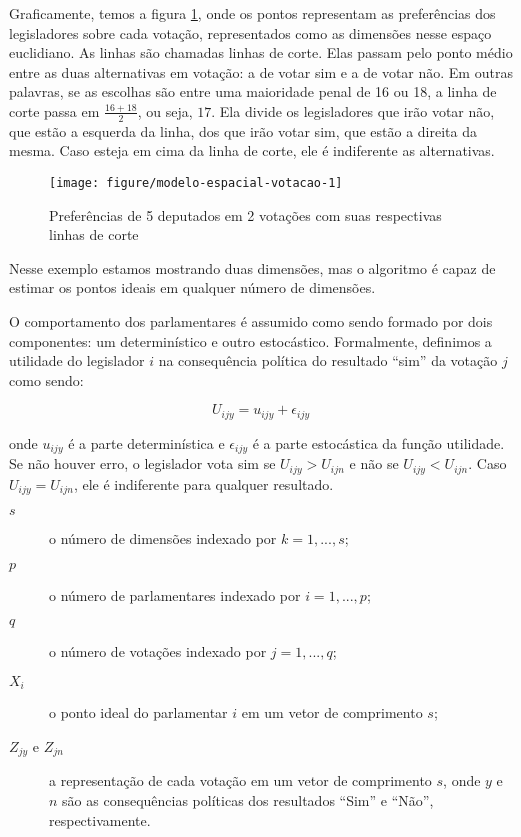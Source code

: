 \documentclass[a4paper,titlepage]{ppgi}\usepackage[]{graphicx}\usepackage[]{color}
\makeatletter
\def\maxwidth{ %
  \ifdim\Gin@nat@width>\linewidth
    \linewidth
  \else
    \Gin@nat@width
  \fi
}
\newenvironment{knitrout}{}{} %
\makeatother
\begin{document}
Graficamente, temos a figura \ref{fig:modelo-espacial-votacao}, onde os pontos
representam as preferências dos legisladores sobre cada votação, representados
como as dimensões nesse espaço euclidiano. As linhas são chamadas linhas de
corte. Elas passam pelo ponto médio entre as duas alternativas em votação: a de
votar sim e a de votar não. Em outras palavras, se as escolhas são entre uma
maioridade penal de 16 ou
18, a linha de corte passa em $\frac{16 + 18}{2}$,
ou seja, $17$. Ela divide os legisladores que irão votar não, que estão a
esquerda da linha, dos que irão votar sim, que estão a direita da mesma. Caso
esteja em cima da linha de corte, ele é indiferente as alternativas.

\begin{knitrout}
\color{fgcolor}\begin{figure}
\texttt{[image: figure/modelo-espacial-votacao-1]} \caption[Preferências de 5 deputados em 2 votações com suas respectivas linhas de corte]{Preferências de 5 deputados em 2 votações com suas respectivas linhas de corte}\label{fig:modelo-espacial-votacao}
\end{figure}


\end{knitrout}

Nesse exemplo estamos mostrando duas dimensões, mas o algoritmo é capaz de
estimar os pontos ideais em qualquer número de dimensões.

O comportamento dos parlamentares é assumido como sendo formado por dois
componentes: um determinístico e outro estocástico. Formalmente, definimos a
utilidade do legislador $i$ na consequência política do resultado ``sim'' da
votação $j$ como sendo:

\begin{equation}
  U_{ijy} = u_{ijy} + \epsilon_{ijy}
\end{equation}

onde $u_{ijy}$ é a parte determinística e $\epsilon_{ijy}$ é a parte
estocástica da função utilidade. Se não houver erro, o legislador vota sim se
$U_{ijy} > U_{ijn}$ e não se $U_{ijy} < U_{ijn}$. Caso $U_{ijy} = U_{ijn}$, ele
é indiferente para qualquer resultado.

\begin{description}
\item[$s$] o número de dimensões indexado por $k = 1, ..., s$;
\item[$p$] o número de parlamentares indexado por $i = 1, ..., p$;
\item[$q$] o número de votações indexado por $j = 1, ..., q$;
\item[$X_i$] o ponto ideal do parlamentar $i$ em um vetor de comprimento $s$;
\item[$Z_{jy}$ e $Z_{jn}$] a representação de cada votação em um vetor de comprimento
$s$, onde $y$ e $n$ são as consequências políticas dos resultados ``Sim'' e
``Não'', respectivamente.
\end{description}
\end{document}
